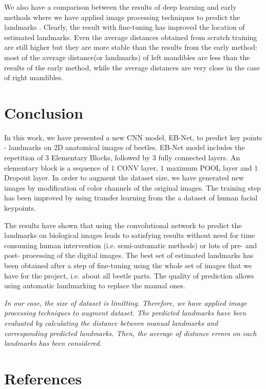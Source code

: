 \documentclass[review]{elsarticle}
\begin{document}
We also have a comparison between the results of deep learning and early methods where we have applied image processing techniques to predict the landmarks \cite{le2017maelab}. Clearly, the result with fine-tuning has improved the location of estimated landmarks. Even the average distances obtained from scratch training are still higher but they are more stable than the results from the early method: most of the average distance(or landmarks) of left mandibles are less than the results of the early method, while the average distances are very close in the case of right mandibles.
\section{Conclusion}
\label{sconclusion}
In this work, we have presented a new CNN model, EB-Net, to predict key points - landmarks on 2D anatomical images of beetles. EB-Net model includes the repetition of $3$ Elementary Blocks, followed by $3$ fully connected layers. An elementary block is a sequence of $1$ CONV layer, $1$ maximum POOL layer and $1$ Dropout layer. In order to augment the dataset size, we have generated new images by modification of color channels of the original images. The training step has been improved by using transfer learning from the a dataset of human facial keypoints.

The results have shown that using the convolutional network to predict the landmarks on biological images leads to satisfying results without need for time consuming human intervention (i.e. semi-automatic methods) or lots of pre- and post- processing of the digital images. The
best set of estimated landmarks has been obtained after a step
of fine-tuning using the whole set of images that we have for the
project, i.e. about all beetle parts. The quality of prediction allows using automatic landmarking to replace the manual ones.

\textit{In our case, the size of dataset is limitting. Therefore, we have applied image processing techniques to augment dataset. The predicted landmarks have been evaluated by calculating the distance between manual landmarks and corresponding predicted landmarks. Then, the average of distance errors on each landmarks has been considered.}
\section*{References}


\end{document}
